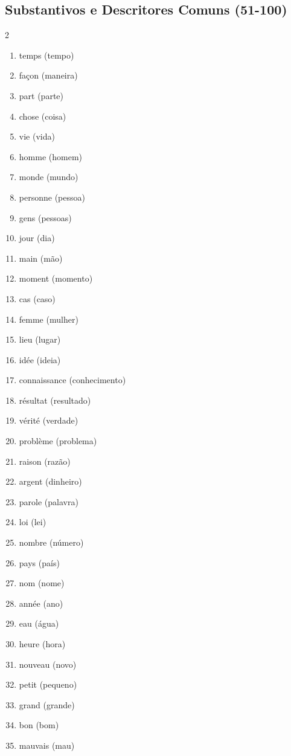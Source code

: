 \documentclass[a4paper,12pt]{article}
\begin{document}
\subsection{Substantivos e Descritores Comuns (51-100)}
\begin{multicols}{2}
\begin{enumerate}[label=\arabic*., start=51]
    \item temps (tempo)
    \item façon (maneira)
    \item part (parte)
    \item chose (coisa)
    \item vie (vida)
    \item homme (homem)
    \item monde (mundo)
    \item personne (pessoa)
    \item gens (pessoas)
    \item jour (dia)
    \item main (mão)
    \item moment (momento)
    \item cas (caso)
    \item femme (mulher)
    \item lieu (lugar)
    \item idée (ideia)
    \item connaissance (conhecimento)
    \item résultat (resultado)
    \item vérité (verdade)
    \item problème (problema)
    \item raison (razão)
    \item argent (dinheiro)
    \item parole (palavra)
    \item loi (lei)
    \item nombre (número)
    \item pays (país)
    \item nom (nome)
    \item année (ano)
    \item eau (água)
    \item heure (hora)
    \item nouveau (novo)
    \item petit (pequeno)
    \item grand (grande)
    \item bon (bom)
    \item mauvais (mau)

\end{enumerate}
\end{multicols}
\end{document}
